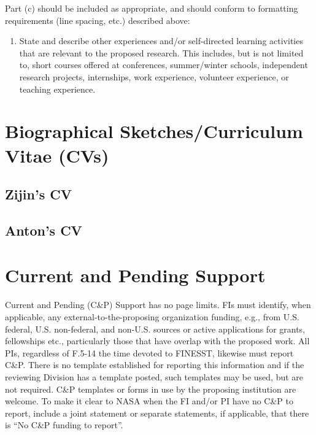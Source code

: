 \documentclass[
  letterpaper,
  DIV=11,
  numbers=noendperiod,
  oneside]{scrartcl}
\providecommand{\tightlist}{%
  \setlength{\itemsep}{0pt}\setlength{\parskip}{0pt}}\usepackage{longtable,booktabs,array}
\begin{document}
Part (c) should be included as appropriate, and should conform to
formatting requirements (line spacing, etc.) described above:

\begin{enumerate}
\def\labelenumi{\alph{enumi}.}
\setcounter{enumi}{2}
\tightlist
\item
  State and describe other experiences and/or self-directed learning
  activities that are relevant to the proposed research. This includes,
  but is not limited to, short courses offered at conferences,
  summer/winter schools, independent research projects, internships,
  work experience, volunteer experience, or teaching experience.
\end{enumerate}

\section{Biographical Sketches/Curriculum Vitae
(CVs)}\label{biographical-sketchescurriculum-vitae-cvs}

\subsection{Zijin's CV}\label{zijins-cv}

\subsection{Anton's CV}\label{antons-cv}

\section{Current and Pending Support}\label{current-and-pending-support}

Current and Pending (C\&P) Support has no page limits. FIs must
identify, when applicable, any external-to-the-proposing organization
funding, e.g., from U.S. federal, U.S. non-federal, and non-U.S. sources
or active applications for grants, fellowships etc., particularly those
that have overlap with the proposed work. All PIs, regardless of F.5-14
the time devoted to FINESST, likewise must report C\&P. There is no
template established for reporting this information and if the reviewing
Division has a template posted, such templates may be used, but are not
required. C\&P templates or forms in use by the proposing institution
are welcome. To make it clear to NASA when the FI and/or PI have no C\&P
to report, include a joint statement or separate statements, if
applicable, that there is ``No C\&P funding to report''.
\end{document}

